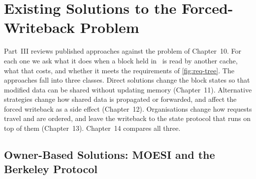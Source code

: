 
\part{Existing Solutions to the Forced-Writeback Problem}
\label{part:solutions}

\begin{center}
\end{center}

\begin{keybox}
Part~III reviews published approaches against the problem of Chapter~10. For each
one we ask what it does when a block held in \stM\ is read by another cache, what
that costs, and whether it meets the requirements of \cref{fig:req-tree}. The
approaches fall into three classes. Direct solutions change the block states so
that modified data can be shared without updating memory (Chapter~11).
Alternative strategies change how shared data is propagated or forwarded, and
affect the forced writeback as a side effect (Chapter~12). Organisations change
how requests travel and are ordered, and leave the writeback to the state
protocol that runs on top of them (Chapter~13). Chapter~14 compares all three.
\end{keybox}

\chapter{Owner-Based Solutions: MOESI and the Berkeley Protocol}
\label{ch:owner}
%

